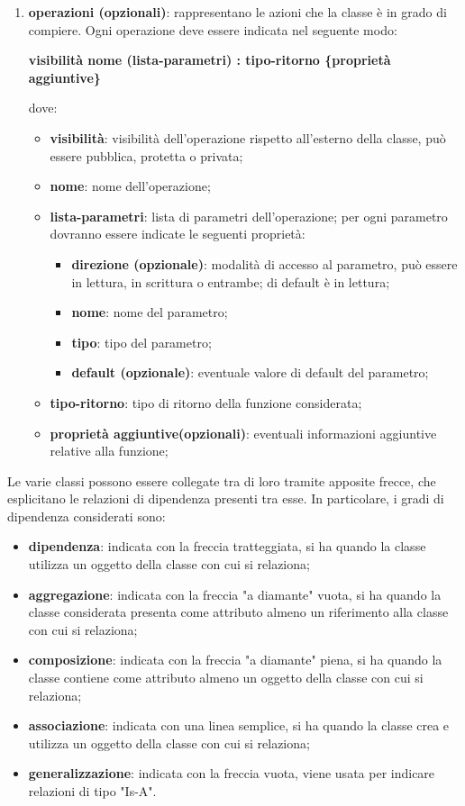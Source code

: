 \begin{enumerate}
    		\item{\textbf{operazioni (opzionali)}}: rappresentano le azioni che la classe è in grado di compiere. Ogni operazione deve essere indicata nel seguente modo:
    			\begin{center}
    				\textbf{visibilità nome (lista-parametri) : tipo-ritorno \{proprietà aggiuntive\}}
    			\end{center}
    		dove:
    			\begin{itemize}
    				\item{\textbf{visibilità}}: visibilità dell'operazione rispetto all'esterno della classe, può essere pubblica, protetta o privata;
    				\item{\textbf{nome}}: nome dell'operazione;
    				\item{\textbf{lista-parametri}}: lista di parametri dell'operazione; per ogni parametro dovranno essere indicate le seguenti proprietà:
     				\begin{itemize}
     					\item{\textbf{direzione (opzionale)}}: modalità di accesso al parametro, può essere in lettura, in scrittura o entrambe; di default è in lettura;
     					\item{\textbf{nome}}: nome del parametro;
     					\item{\textbf{tipo}}: tipo del parametro;
     					\item{\textbf{default (opzionale)}}: eventuale valore di default del parametro;
     				\end{itemize}
    				\item{\textbf{tipo-ritorno}}: tipo di ritorno della funzione considerata;
				\item{\textbf{proprietà aggiuntive(opzionali)}}: eventuali informazioni aggiuntive relative alla funzione;
    			\end{itemize}
    	\end{enumerate}
    	Le varie classi possono essere collegate tra di loro tramite apposite frecce, che esplicitano le relazioni di dipendenza presenti tra esse. In particolare, i gradi di dipendenza considerati sono:
    	\begin{itemize}
    		\item{\textbf{dipendenza}}: indicata con la freccia tratteggiata, si ha quando la classe utilizza un oggetto della classe con cui si relaziona;
    		\item{\textbf{aggregazione}}: indicata con la freccia "a diamante" vuota, si ha quando la classe considerata presenta come attributo almeno un riferimento alla classe con cui si relaziona;
    		\item{\textbf{composizione}}: indicata con la freccia "a diamante" piena, si ha quando la classe contiene come attributo almeno un oggetto della classe con cui si relaziona;
    		\item{\textbf{associazione}}: indicata con una linea semplice, si ha quando la classe crea e utilizza un oggetto della classe con cui si relaziona;
    		\item{\textbf{generalizzazione}}: indicata con la freccia vuota, viene usata per indicare relazioni di tipo "Is-A".
    	\end{itemize}

